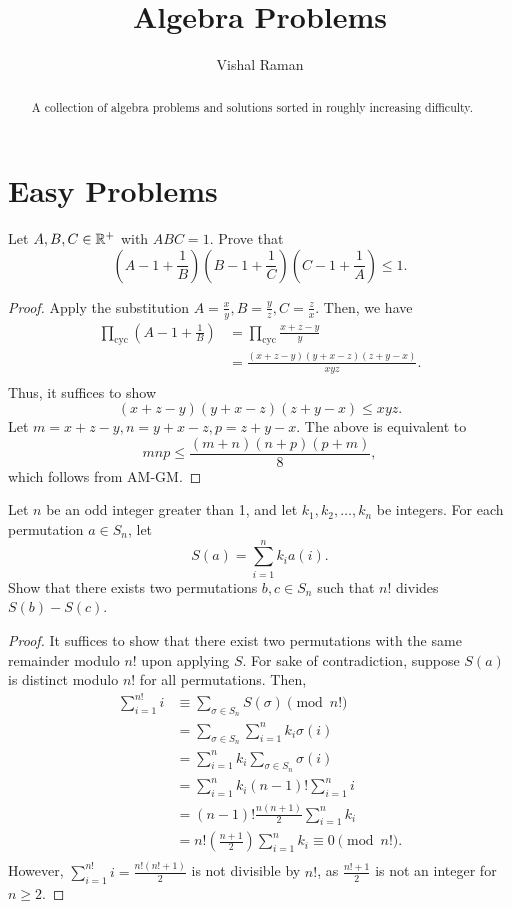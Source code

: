 \documentclass[11pt]{scrartcl}
\begin{document}
\title{Algebra Problems}
\author{Vishal Raman}
\maketitle
\begin{abstract}
    A collection of algebra problems and solutions sorted in roughly increasing difficulty.
\end{abstract}
\section{Easy Problems}
\begin{problem}
	[IMO 2000/2] Let $A, B, C \in \mathbb R^+$ with $ABC = 1$.  Prove that 
	$$\left (A -1 + \frac{1}{B}\right )\left (B -1 + \frac{1}{C}\right )\left (C -1 + \frac{1}{A}\right ) \le 1.$$
\end{problem}
\begin{proof}
Apply the substitution $A = \frac{x}{y}, B = \frac{y}{z}, C = \frac{z}{x}$.  Then, we have 
\begin{align*}
\prod_{\text{cyc}}\left (A -1 + \frac{1}{B}\right )&= \prod_{\text{cyc}}\frac{x+z-y}{y} \\
&= \frac{(x+z-y)(y+x-z)(z+y-x)}{xyz}.\\
\end{align*}
Thus, it suffices to show
$$(x+z-y)(y+x-z)(z+y-x) \le xyz.$$
Let $m = x+z-y, n = y + x - z, p = z + y - x$.  The above is equivalent to 
$$mnp \le \frac{(m+n)(n+p)(p+m)}{8},$$
which follows from AM-GM.
\end{proof}
\begin{problem}
	[IMO 2001/4] Let $n$ be an odd integer greater than 1, and let $k_1, k_2, \dots, k_n$ be integers.  For each permutation $a \in S_n$, let $$S(a) = \sum_{i=1}^n k_ia(i).$$  Show that there exists two permutations $b, c \in S_n$ such that $n!$ divides $S(b) - S(c)$.
\end{problem}
\begin{proof}
It suffices to show that there exist two permutations with the same remainder modulo $n!$ upon applying $S$.  For sake of contradiction, suppose $S(a)$ is distinct modulo $n!$ for all permutations.  Then,
\begin{align*}
\sum_{i=1}^{n!} i &\equiv \sum_{\sigma \in S_n} S(\sigma) \pmod{n!} \\
&= \sum_{\sigma \in S_n} \sum_{i=1}^n k_i \sigma(i) \\
&= \sum_{i=1}^n k_i \sum_{\sigma \in S_n} \sigma(i) \\
&= \sum_{i=1}^n k_i (n-1)! \sum_{i=1}^n i \\
&= (n-1)! \frac{n(n+1)}{2} \sum_{i=1}^n k_i \\
&= n! \left (\frac{n+1}{2}\right ) \sum_{i=1}^n k_i  \equiv 0 \pmod{n!}. \\
\end{align*}
However,
$\sum_{i=1}^{n!}i = \frac{n!(n!+1)}{2}$ is not divisible by $n!$, as $\frac{n!+1}{2}$ is not an integer for $n \ge 2$.
\end{proof}
\end{document}
